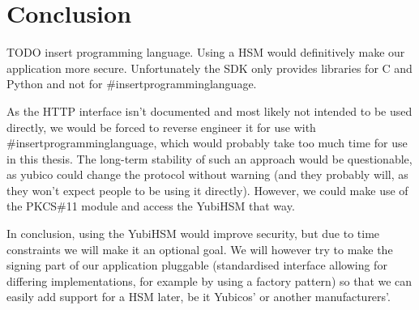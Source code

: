 \section{Conclusion}\label{sec:conclusion}
TODO insert programming language.
Using a \gls{HSM} would definitively make our application more secure.
Unfortunately the \gls{SDK} only provides libraries for C and Python and not for \#insertprogramminglanguage.

As the \gls{HTTP} interface isn't documented and most likely not intended to be used directly,
we would be forced to reverse engineer it for use with \#insertprogramminglanguage,
which would probably take too much time for use in this thesis.
The long-term stability of such an approach would be questionable,
as yubico could change the protocol without warning (and they probably will, as they won't expect people to be using it directly).
However, we could make use of the \gls{PKCS}\#11 module and access the YubiHSM that way.

In conclusion, using the YubiHSM would improve security, but due to time constraints we will make it an optional goal.
We will however try to make the signing part of our application pluggable (standardised interface allowing for differing implementations,
for example by using a factory pattern) so that we can easily add support for a \gls{HSM} later,
be it Yubicos' or another manufacturers'.